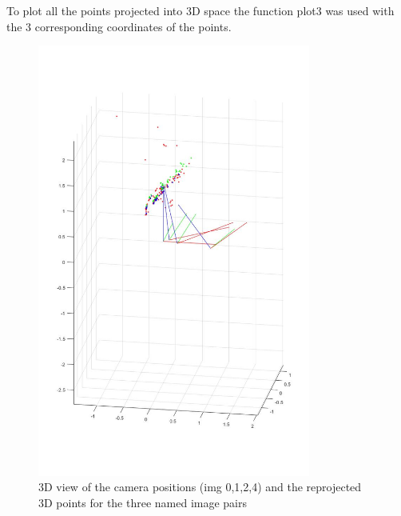 \documentclass[12pt]{article}
\begin{document}
To plot all the points projected into 3D space the function plot3 was used with the 3 corresponding coordinates of the points. 

\vspace{5mm}
\begin{figure}[H]
	\centering
	\includegraphics[width=0.8\textwidth]{5.jpg}
	\caption{3D view of the camera positions (img 0,1,2,4) and the reprojected 3D points for the three named image pairs}
	\label{fig1}
\end{figure}
\vspace{5mm}
\end{document}
